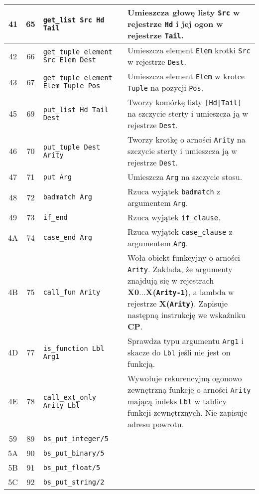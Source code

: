 \begin{longtable}{|c|c|p{5cm}|p{7cm}|}
\hline
41 & 65 & \texttt{get\_list Src Hd Tail} & Umieszcza głowę listy \texttt{Src} w rejestrze \texttt{Hd} i jej ogon w rejestrze \texttt{Tail}. \\
\hline
42 & 66 & \texttt{get\_tuple\_element Src Elem Dest} & Umieszcza element \texttt{Elem} krotki \texttt{Src} w rejestrze \texttt{Dest}.\\
\hline
43 & 67 & \texttt{get\_tuple\_element Elem Tuple Pos} & Umieszcza element \texttt{Elem} w krotce \texttt{Tuple} na pozycji \texttt{Pos}.\\
\hline
45 & 69 & \texttt{put\_list Hd Tail Dest} & Tworzy komórkę listy \texttt{[Hd|Tail]} na szczycie sterty i umieszcza ją w rejestrze \texttt{Dest}.\\
\hline
46 & 70 & \texttt{put\_tuple Dest Arity} & Tworzy krotkę o arności \texttt{Arity} na szczycie sterty i umieszcza ją w rejestrze \texttt{Dest}.\\
\hline
47 & 71 & \texttt{put Arg} & Umieszcza \texttt{Arg} na szczycie stosu.\\
\hline
48 & 72 & \texttt{badmatch Arg} & Rzuca wyjątek \texttt{badmatch} z argumentem \texttt{Arg}.\\
\hline
49 & 73 & \texttt{if\_end} & Rzuca wyjątek \texttt{if\_clause}.\\
\hline
4A & 74 & \texttt{case\_end Arg} & Rzuca wyjątek \texttt{case\_clause} z argumentem \texttt{Arg}.\\
\hline
4B & 75 & \texttt{call\_fun Arity} & Woła obiekt funkcyjny o arności \texttt{Arity}. Zakłada, że argumenty znajdują się w rejestrach \textbf{X0}...\textbf{X(\texttt{Arity-1})}, a lambda w rejestrze \textbf{X(\texttt{Arity})}. Zapisuje następną instrukcję we wskaźniku \textbf{CP}.\\
\hline
4D & 77 & \texttt{is\_function Lbl Arg1} & Sprawdza typu argumentu \texttt{Arg1} i skacze do \texttt{Lbl} jeśli nie jest on funkcją.\\
\hline
4E & 78 & \texttt{call\_ext\_only Arity Lbl} & Wywołuje rekurencyjną ogonowo zewnętrzną funkcję o arności \texttt{Arity} mającą indeks \texttt{Lbl} w tablicy funkcji zewnętrznych. Nie zapisuje adresu powrotu.\\
\hline
59 & 89 & \texttt{bs\_put\_integer/5} & \\
\hline
5A & 90 & \texttt{bs\_put\_binary/5} & \\
\hline
5B & 91 & \texttt{bs\_put\_float/5} & \\
\hline
5C & 92 & \texttt{bs\_put\_string/2} & \\
\hline

\end{longtable}
